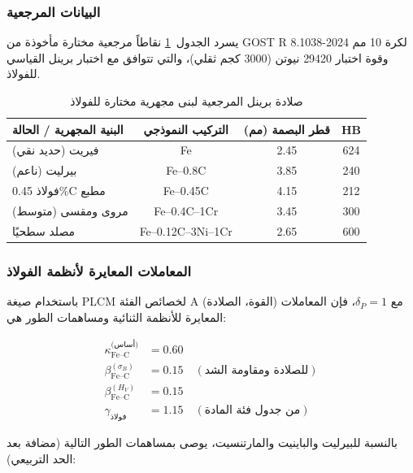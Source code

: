 \documentclass[12pt,a4paper]{article}
\begin{document}
	\subsubsection{البيانات المرجعية}
	
	يسرد الجدول~\ref{tab:steel_reference} نقاطاً مرجعية مختارة مأخوذة من GOST R 8.1038-2024 لكرة 10 مم وقوة اختبار 29420 نيوتن (3000 كجم ثقلي)، والتي تتوافق مع اختبار برينل القياسي للفولاذ.
	
	\begin{table}[htbp]
		\centering
		\caption{صلادة برينل المرجعية لبنى مجهرية مختارة للفولاذ}
		\label{tab:steel_reference}
		\begin{tabular}{lccc}
			\toprule
			\textbf{البنية المجهرية / الحالة} & \textbf{التركيب النموذجي} & \textbf{قطر البصمة (مم)} & \textbf{HB} \\
			\midrule
			فيريت (حديد نقي) & Fe & 2.45 & 624 \\
			بيرليت (ناعم) & Fe–0.8C & 3.85 & 240 \\
			فولاذ 0.45\%C مطبع & Fe–0.45C & 4.15 & 212 \\
			مروى ومقسى (متوسط) & Fe–0.4C–1Cr & 3.45 & 300 \\
			مصلد سطحيًا & Fe–0.12C–3Ni–1Cr & 2.65 & 600 \\
			\bottomrule
		\end{tabular}
	\end{table}
	
	\subsubsection{المعاملات المعايرة لأنظمة الفولاذ}
	
	باستخدام صيغة PLCM لخصائص الفئة A (القوة، الصلادة) مع \(\delta_P = 1\)، فإن المعاملات المعايرة للأنظمة الثنائية ومساهمات الطور هي:
	
	\begin{align*}
		\kappa_{\text{Fe–C}}^{\text{(أساس)}} &= 0.60 \\
		\beta_{\text{Fe–C}}^{(\sigma_B)} &= 0.15 \quad (\text{للصلادة ومقاومة الشد}) \\
		\beta_{\text{Fe–C}}^{(H_V)} &= 0.15 \\
		\gamma_{\text{فولاذ}} &= 1.15 \quad (\text{من جدول فئة المادة})
	\end{align*}
	
	بالنسبة للبيرليت والباينيت والمارتنسيت، يوصى بمساهمات الطور التالية (مضافة بعد الحد التربيعي):
	
\end{document}
